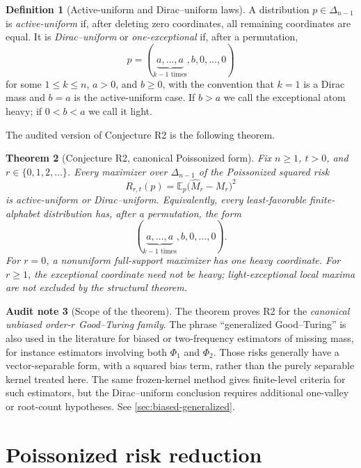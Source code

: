 \documentclass[11pt]{article}
\newtheorem{theorem}{Theorem}[section]
\theoremstyle{definition}
\newtheorem{definition}[theorem]{Definition}
\newtheorem{audit}[theorem]{Audit note}
\newcommand{\E}{\mathbb E}
\begin{document}
\begin{definition}[Active-uniform and Dirac--uniform laws]
A distribution $p\in\Delta_{n-1}$ is \emph{active-uniform} if, after deleting zero coordinates, all remaining coordinates are equal.  It is \emph{Dirac--uniform} or \emph{one-exceptional} if, after a permutation,
\[
  p=(\underbrace{a,\ldots,a}_{k-1\text{ times}},b,0,\ldots,0)
\]
for some $1\le k\le n$, $a>0$, and $b\ge0$, with the convention that $k=1$ is a Dirac mass and $b=a$ is the active-uniform case.  If $b>a$ we call the exceptional atom heavy; if $0<b<a$ we call it light.
\end{definition}

The audited version of Conjecture R2 is the following theorem.

\begin{theorem}[Conjecture R2, canonical Poissonized form]\label{thm:R2}
Fix $n\ge1$, $t>0$, and $r\in\{0,1,2,\ldots\}$.  Every maximizer over $\Delta_{n-1}$ of the Poissonized squared risk
\[
  R_{r,t}(p)=\E_p\bigl(\widehat M_r-M_r\bigr)^2
\]
is active-uniform or Dirac--uniform.  Equivalently, every least-favorable finite-alphabet distribution has, after a permutation, the form
\[
  (\underbrace{a,\ldots,a}_{k-1\text{ times}},b,0,
  \ldots,0).
\]
For $r=0$, a nonuniform full-support maximizer has one heavy coordinate.  For $r\ge1$, the exceptional coordinate need not be heavy; light-exceptional local maxima are not excluded by the structural theorem.
\end{theorem}

\begin{audit}[Scope of the theorem]
The theorem proves R2 for the \emph{canonical unbiased order-$r$ Good--Turing family}.  The phrase ``generalized Good--Turing'' is also used in the literature for biased or two-frequency estimators of missing mass, for instance estimators involving both $\Phi_1$ and $\Phi_2$.  Those risks generally have a vector-separable form, with a squared bias term, rather than the purely separable kernel treated here.  The same frozen-kernel method gives finite-level criteria for such estimators, but the Dirac--uniform conclusion requires additional one-valley or root-count hypotheses.  See \cref{sec:biased-generalized}.
\end{audit}

\section{Poissonized risk reduction}
\end{document}
